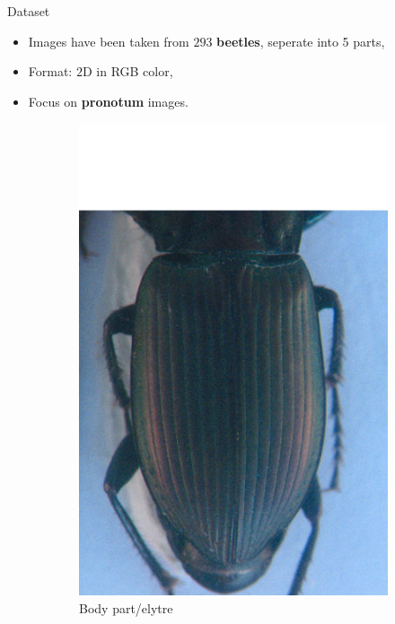 \documentclass[10pt,svgnames]{beamer}
\begin{document}


\begin{frame}[c]{Dataset}
	\begin{itemize}
    	\item Images have been taken from $293$ \textbf{beetles}, seperate into 5 parts,
    	\item Format: $2$D in RGB color,
    	\item Focus on \textbf{\color{red}pronotum} images.
  	\end{itemize}
	
	\begin{figure}[htbp]
    			\begin{subfigure}[t]{0.3\textwidth}
        			\centering
        			\includegraphics[scale=.2]{images/elytre2}
        			\caption*{\footnotesize{Body part/elytre}}
        			\label{figsub22}
    			\end{subfigure}
    			~ 
    			\begin{subfigure}[t]{0.3\textwidth}

\end{subfigure}
\end{figure}
\end{frame}
\end{document}
